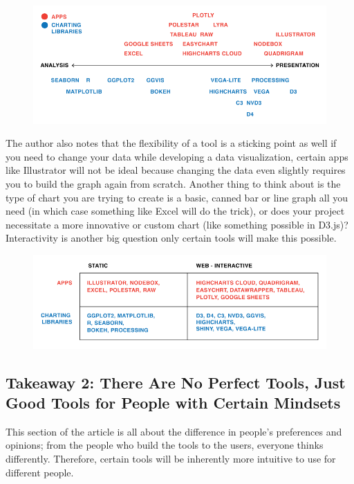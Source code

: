 \documentclass[]{book}
\theoremstyle{definition}
\theoremstyle{definition}
\theoremstyle{definition}
\theoremstyle{remark}
\begin{document}
\begin{figure}
\centering
\includegraphics{images/analysis_spectrum.png}
\caption{}
\end{figure}

The author also notes that the flexibility of a tool is a sticking point
as well if you need to change your data while developing a data
visualization, certain apps like Illustrator will not be ideal because
changing the data even slightly requires you to build the graph again
from scratch. Another thing to think about is the type of chart you are
trying to create is a basic, canned bar or line graph all you need (in
which case something like Excel will do the trick), or does your project
necessitate a more innovative or custom chart (like something possible
in D3.js)? Interactivity is another big question only certain tools will
make this possible.

\begin{figure}
\centering
\includegraphics{images/interactivity.png}
\caption{}
\end{figure}

\subsection{Takeaway 2: There Are No Perfect Tools, Just Good Tools for
People with Certain
Mindsets}\label{takeaway-2-there-are-no-perfect-tools-just-good-tools-for-people-with-certain-mindsets}

This section of the article is all about the difference in people's
preferences and opinions; from the people who build the tools to the
users, everyone thinks differently. Therefore, certain tools will be
inherently more intuitive to use for different people.
\end{document}
